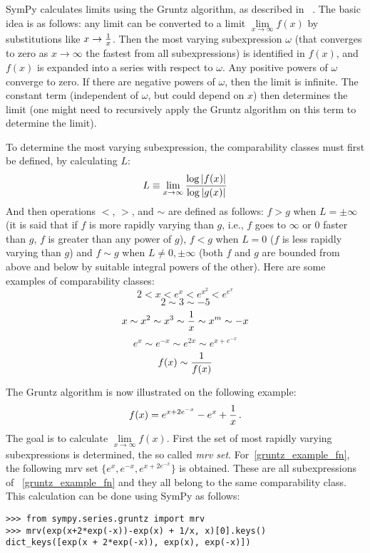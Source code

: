 SymPy calculates limits using the Gruntz algorithm, as described in%
~\cite{Gruntz1996limits}. The basic idea is as follows: any limit can be
converted to a limit $\lim\limits_{x\to\infty} f(x)$ by substitutions like
$x\to{1\over x}$. Then the most varying subexpression $\omega$ (that converges
to zero as $x\to\infty$ the fastest from all subexpressions) is identified in
$f(x)$, and $f(x)$ is expanded into a series with respect to $\omega$. Any
positive powers of $\omega$ converge to zero. If there are negative powers of
$\omega$, then the limit is infinite. The constant term (independent of
$\omega$, but could depend on $x$) then determines the limit (one might need to
recursively apply the Gruntz algorithm on this term to determine the limit).

To determine the most varying subexpression, the comparability classes must
first be defined, by calculating $L$:
\begin{equation}
L\equiv \lim_{x\to\infty} {\log |f(x)| \over \log |g(x)|}
\end{equation}
And then operations $<$, $>$, and $\sim$ are defined as follows: $f>g$ when
$L=\pm\infty$ (it is said that if $f$ is more rapidly varying than $g$, i.e., $f$
goes to $\infty$ or $0$ faster than $g$, $f$ is greater than any power of $g$),
$f<g$ when $L=0$ ($f$ is less rapidly varying than $g$) and $f\sim g$ when
$L\neq 0,\pm\infty$ (both $f$ and $g$ are bounded from above and below by
suitable integral powers of the other). Here are some examples of comparability
classes:
$$2 < x < e^x < e^{x^2} < e^{e^x}$$
$$2\sim 3\sim -5$$
$$x\sim x^2\sim x^3\sim {1\over x}\sim x^m\sim -x$$
$$e^x\sim e^{-x}\sim e^{2x}\sim e^{x+e^{-x}}$$
$$f(x)\sim{1\over f(x)}$$

The Gruntz algorithm is now illustrated on the following example:
\begin{equation}
    \label{gruntz_example_fn}
f(x) = e^{x+2e^{-x}} - e^x + {1\over x} \,.
\end{equation}
The goal is to calculate $\lim\limits_{x\to\infty} f(x)$.
First the set of most rapidly varying subexpressions is determined, the so
called \textit{mrv set}. For~\eqref{gruntz_example_fn}, the following mrv set
$\{e^x, e^{-x}, e^{x+2e^{-x}}\}$ is obtained. These are all subexpressions of%
~\eqref{gruntz_example_fn} and they all belong to the same comparability class.
This calculation can be done using SymPy as follows:

\begin{verbatim}
>>> from sympy.series.gruntz import mrv
>>> mrv(exp(x+2*exp(-x))-exp(x) + 1/x, x)[0].keys()
dict_keys([exp(x + 2*exp(-x)), exp(x), exp(-x)])
\end{verbatim}

